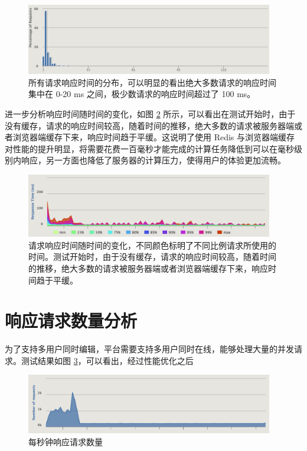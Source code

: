 \begin{figure}
\centering
\includegraphics[width=108mm]{images/responsedis}
\caption{所有请求响应时间的分布，可以明显的看出绝大多数请求的响应时间集中在 0-20 ms 之间，极少数请求的响应时间超过了 100 ms。}
\label{responsedis}
\end{figure}

进一步分析响应时间随时间的变化，如图 \ref{responsetime} 所示，可以看出在测试开始时，由于没有缓存，请求的响应时间较高，随着时间的推移，绝大多数的请求被服务器端或者浏览器端缓存下来，响应时间趋于平缓。这说明了使用 Redis 与浏览器端缓存对性能的提升明显，将需要花费一百毫秒才能完成的计算任务降低到可以在毫秒级别内响应，另一方面也降低了服务器的计算压力，使得用户的体验更加流畅。

\begin{figure}
\centering
\includegraphics[width=108mm]{images/responsetime}
\caption{请求响应时间随时间的变化，不同颜色标明了不同比例请求所使用的时间。测试开始时，由于没有缓存，请求的响应时间较高，随着时间的推移，绝大多数的请求被服务器端或者浏览器端缓存下来，响应时间趋于平缓。}
\label{responsetime}
\end{figure}

\section{响应请求数量分析}
为了支持多用户同时编辑，平台需要支持多用户同时在线，能够处理大量的并发请求。测试结果如图 \ref{requests}，可以看出，经过性能优化之后

\begin{figure}
\centering
\includegraphics[width=108mm]{images/requests}
\caption{每秒钟响应请求数量}
\label{requests}
\end{figure}


